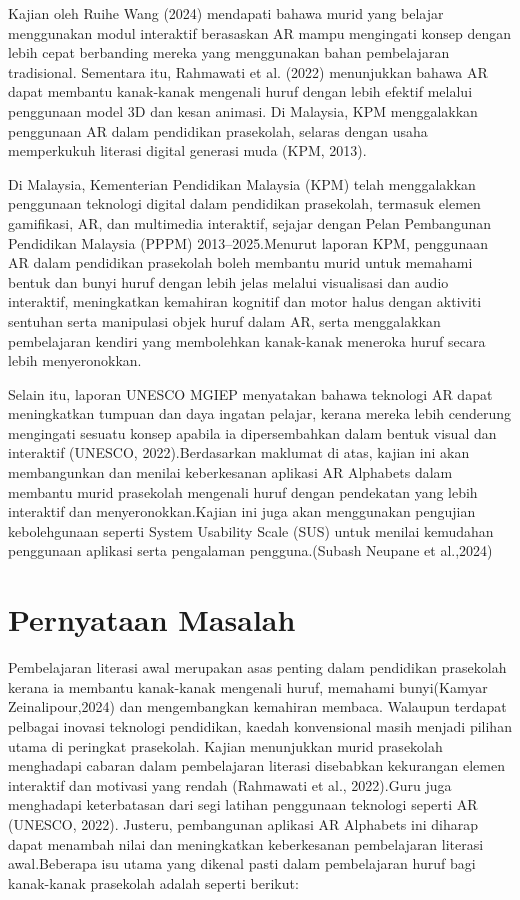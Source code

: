 \hspace{1cm}Kajian oleh Ruihe Wang  (2024) mendapati bahawa murid yang belajar menggunakan modul interaktif berasaskan AR mampu mengingati konsep dengan lebih cepat berbanding mereka yang menggunakan bahan pembelajaran tradisional. Sementara itu, Rahmawati et al. (2022) menunjukkan bahawa AR dapat membantu kanak-kanak mengenali huruf dengan lebih efektif melalui penggunaan model 3D dan kesan animasi. Di Malaysia, KPM menggalakkan penggunaan AR dalam pendidikan prasekolah, selaras dengan usaha memperkukuh literasi digital generasi muda (KPM, 2013).

\hspace{1cm}Di Malaysia, Kementerian Pendidikan Malaysia (KPM) telah menggalakkan penggunaan teknologi digital dalam pendidikan prasekolah, termasuk elemen gamifikasi, AR, dan multimedia interaktif, sejajar dengan Pelan Pembangunan Pendidikan Malaysia (PPPM) 2013--2025.Menurut laporan KPM, penggunaan AR dalam pendidikan prasekolah boleh membantu murid untuk memahami bentuk dan bunyi huruf dengan lebih jelas melalui visualisasi dan audio interaktif, meningkatkan kemahiran kognitif dan motor halus dengan aktiviti sentuhan serta manipulasi objek huruf dalam AR, serta menggalakkan pembelajaran kendiri yang membolehkan kanak-kanak meneroka huruf secara lebih menyeronokkan.

\hspace{1cm}Selain itu, laporan UNESCO MGIEP menyatakan bahawa teknologi AR dapat meningkatkan tumpuan dan daya ingatan pelajar, kerana mereka lebih cenderung mengingati sesuatu konsep apabila ia dipersembahkan dalam bentuk visual dan interaktif (UNESCO, 2022).Berdasarkan maklumat di atas, kajian ini akan membangunkan dan menilai keberkesanan aplikasi AR Alphabets dalam membantu murid prasekolah mengenali huruf dengan pendekatan yang lebih interaktif dan menyeronokkan.Kajian ini juga akan menggunakan pengujian kebolehgunaan seperti System Usability Scale (SUS) untuk menilai kemudahan penggunaan aplikasi serta pengalaman pengguna.(Subash Neupane  et al.,2024)

\section{{Pernyataan Masalah}}

Pembelajaran literasi awal merupakan asas penting dalam pendidikan prasekolah kerana ia membantu kanak-kanak mengenali huruf, memahami bunyi(Kamyar Zeinalipour,2024) dan mengembangkan kemahiran membaca. Walaupun terdapat pelbagai inovasi teknologi pendidikan, kaedah konvensional masih menjadi pilihan utama di peringkat prasekolah. Kajian menunjukkan murid prasekolah menghadapi cabaran dalam pembelajaran literasi disebabkan kekurangan elemen interaktif dan motivasi yang rendah (Rahmawati et al., 2022).Guru juga menghadapi keterbatasan dari segi latihan penggunaan teknologi seperti AR (UNESCO, 2022). Justeru, pembangunan aplikasi AR Alphabets ini diharap dapat menambah nilai dan meningkatkan keberkesanan pembelajaran literasi awal.Beberapa isu utama yang dikenal pasti dalam pembelajaran huruf bagi kanak-kanak prasekolah adalah seperti berikut:\\


